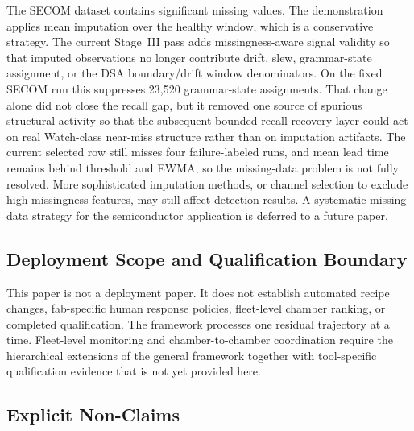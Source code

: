 \documentclass[11pt,letterpaper]{article}
\theoremstyle{scresult}
\begin{document}
The SECOM dataset contains significant missing values. The demonstration
applies mean imputation over the healthy window, which is a conservative
strategy. The current Stage~III pass adds missingness-aware signal validity so
that imputed observations no longer contribute drift, slew, grammar-state
assignment, or the DSA boundary/drift window denominators. On the fixed SECOM
run this suppresses 23,520 grammar-state assignments. That change alone did
not close the recall gap, but it removed one source of spurious structural
activity so that the subsequent bounded recall-recovery layer could act on
real Watch-class near-miss structure rather than on imputation artifacts. The
current selected row still misses four failure-labeled runs, and mean lead time
remains behind threshold and EWMA, so the missing-data problem is not fully
resolved. More sophisticated imputation methods, or channel selection to
exclude high-missingness features, may still affect detection results. A
systematic missing data strategy for the semiconductor application is deferred
to a future paper.

\subsection{Deployment Scope and Qualification Boundary}

This paper is not a deployment paper. It does not establish automated recipe
changes, fab-specific human response policies, fleet-level chamber ranking, or
completed qualification. The framework processes one residual trajectory at a
time. Fleet-level monitoring and chamber-to-chamber coordination require the
hierarchical extensions of the general framework together with tool-specific
qualification evidence that is not yet provided here.

\subsection{Explicit Non-Claims}
\end{document}
